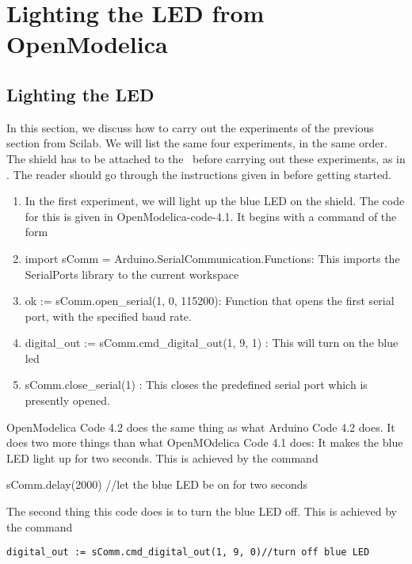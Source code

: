\section{Lighting the LED from OpenModelica}
\subsection{Lighting the LED}
\label{sec:light-OpenModelica}
In this section, we discuss how to carry out the experiments of the
previous section from Scilab.  We will list the same four experiments,
in the same order.  The shield has to be attached to the \arduino\
before carrying out these experiments, as in .
The reader should go through the instructions given in
 before getting started.

\begin{enumerate}
  \item In the first experiment, we will light up the blue LED on the
        shield.  The code for this is given in OpenModelica-code-4.1.
        It begins with a command of the form
        
  \item import sComm = Arduino.SerialCommunication.Functions: This imports the SerialPorts library to the current workspace
  \item ok := sComm.open\_serial(1, 0, 115200): Function that opens the first serial port, with the specified baud rate.
        
  \item digital\_out := sComm.cmd\_digital\_out(1, 9, 1) : This will turn on the blue led
        
  \item sComm.close\_serial(1) : This closes the predefined serial port which is presently opened.
\end{enumerate}

OpenModelica Code 4.2 does the same thing as what Arduino Code 4.2 does. It does
two more things than what OpenMOdelica Code 4.1 does: It makes the blue LED light
up for two seconds. This is achieved by the command

sComm.delay(2000)  //let the blue LED be on for two seconds

The second thing this code does is to turn the blue LED off. This is achieved
by the command

\begin{lstlisting}[style=nonumbers]
     digital_out := sComm.cmd_digital_out(1, 9, 0)//turn off blue LED
  \end{lstlisting}

